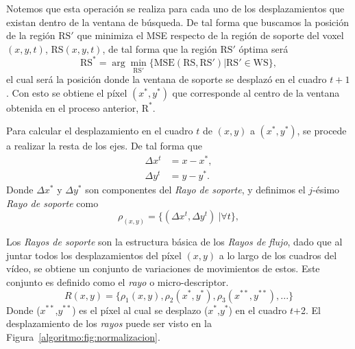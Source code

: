	Notemos que esta operación se realiza para cada uno de los desplazamientos que existan dentro de la ventana de búsqueda. De tal forma que buscamos la posición de la región $\text{RS}'$ que minimiza el MSE respecto de la región de soporte del voxel $(x,y,t)$, $\text{RS}(x,y,t)$, de tal forma que la región $\text{RS}'$ óptima será
	\begin{equation}
		\text{RS}^* = \arg \min_{\text{RS}'}\{\text{MSE}(\text{RS},\text{RS}') | \text{RS}' \in \text{WS} \},
	\end{equation}		
	el cual será la posición donde la ventana de soporte se desplazó en el cuadro $t+1$. Con esto se obtiene el píxel $(x^*,y^*)$ que corresponde al centro de la ventana obtenida en el proceso anterior, $\text{R}^*$.
	
	Para calcular el desplazamiento en el cuadro $t$ de $(x,y)$ a $(x^*,y^*)$, se procede a realizar la resta de los ejes. De tal forma que
	\begin{align}
		\Delta x^{t} &= x-x^*,\\ 
		\Delta y^{t} &= y-y^*.
	\end{align}
		Donde $ \Delta x^*$ y $ \Delta y^*$ son componentes del \textit{Rayo de soporte}, y definimos el $j$-ésimo \textit{Rayo de soporte} como
	\begin{equation}
		\rho_{(x,y)} = \{(\Delta x^{t}, \Delta y^{t})~| \forall t\},
	\end{equation}		
	
	Los \textit{Rayos de soporte} son la estructura básica de los \textit{Rayos de flujo}, dado que al juntar todos los desplazamientos del píxel $(x,y)$ a lo largo de los cuadros del vídeo, se obtiene un conjunto de variaciones de movimientos de estos. Este conjunto es definido como el \textit{rayo} o micro-descriptor.
	\begin{equation}
		R(x,y)	 = \{\rho_1(x,y), \rho_2(x^*,y^*), \rho_3(x^{**},y^{**}), ... \}
	\end{equation}
		Donde ($x^{**}$,$y^{**}$) es el píxel al cual se desplazo ($x^{*}$,$y^{*}$) en el cuadro $t$+2. El desplazamiento de los \textit{rayos} puede ser visto en la Figura~\ref{algoritmo:fig:normalizacion}.
		
		
